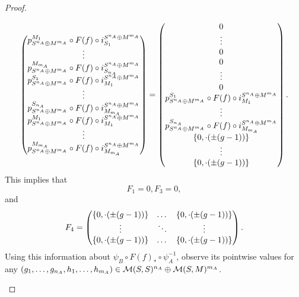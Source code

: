 \begin{proof}
\begin{enumerate}
{\[\begin{pmatrix}
                    p_{S^{n_A} \oplus M^{m_A}}^{M_1} \circ F(f) \circ i_{S_1}^{S^{n_A} \oplus M^{m_A}} \\
                    \vdots \\
                    p_{S^{n_A} \oplus M^{m_A}}^{M_{m_A}} \circ F(f) \circ i_{S_{n_A}}^{S^{n_A} \oplus M^{m_A}} \\
                    p_{S^{n_A} \oplus M^{m_A}}^{S_1} \circ F(f) \circ i_{M_1}^{S^{n_A} \oplus M^{m_A}} \\
                    \vdots \\
                    p_{S^{n_A} \oplus M^{m_A}}^{S_{n_A}} \circ F(f) \circ i_{M_{m_A}}^{S^{n_A} \oplus M^{m_A}} \\
                    p_{S^{n_A} \oplus M^{m_A}}^{M_1} \circ F(f) \circ i_{M_1}^{S^{n_A} \oplus M^{m_A}} \\
                    \vdots \\
                    p_{S^{n_A} \oplus M^{m_A}}^{M_{m_A}} \circ F(f) \circ i_{M_{m_A}}^{S^{n_A} \oplus M^{m_A}}
                \end{pmatrix}
                = \begin{pmatrix}
                    0 \\
                    \vdots \\
                    0 \\
                    0 \\
                    \vdots \\
                    0 \\
                    p_{S^{n_A} \oplus M^{m_A}}^{S_1} \circ F(f) \circ i_{M_1}^{S^{n_A} \oplus M^{m_A}} \\
                    \vdots \\
                    p_{S^{n_A} \oplus M^{m_A}}^{S_{n_A}} \circ F(f) \circ i_{M_{m_A}}^{S^{n_A} \oplus M^{m_A}} \\
                    \left\{ 0, \cdot(\pm(g - 1)) \right\} \\
                    \vdots \\
                    \left\{ 0, \cdot(\pm(g - 1)) \right\}
                \end{pmatrix}.
            \]
            This implies that
            \[
                F_1 = 0, F_3 = 0,
            \]
            and
            \[
                F_4 = \begin{pmatrix}
                    \left\{ 0, \cdot(\pm(g - 1)) \right\} & \dots & \left\{ 0, \cdot(\pm(g - 1)) \right\} \\
                    \vdots & \ddots & \vdots \\
                    \left\{ 0, \cdot(\pm(g - 1)) \right\} & \dots & \left\{ 0, \cdot(\pm(g - 1)) \right\}
                \end{pmatrix}.
            \]
            Using this information about \( \psi_B \circ F(f)_* \circ \psi_A^{-1} \), observe its pointwise values for any \( \left( g_1, \dots, g_{n_A}, h_1, \dots, h_{m_A} \right) \in {\mathcal{M}}(S, S)^{n_A} \oplus {\mathcal{M}}(S, M)^{m_A} \).
            
}
\end{enumerate}
\end{proof}
